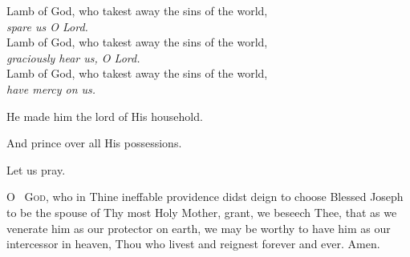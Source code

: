 Lamb of God, who takest away the sins of the world,\\
\qquad	\textit{spare us O Lord.}\\
Lamb of God, who takest away the sins of the world,\\
\qquad	\textit{graciously hear us, O Lord.}\\
Lamb of God, who takest away the sins of the world,\\
\qquad	\textit{have mercy on us.}

\bigskip

\begin{hangparas}{1em}{-1}
\parskip0mm
\Vbar He made him the lord of His household.
 
 \Rbar And prince over all His possessions.
 
 \end{hangparas}

{\centering Let us pray.\par}

\lettrine{O}{~ God,} who in Thine ineffable providence didst deign to choose Blessed Joseph to be the spouse of Thy most Holy Mother,
grant, we beseech Thee, that as we venerate him as our protector on earth, 
we may be worthy to have him as our intercessor in heaven,
Thou who livest and reignest forever and ever. 
\Rbar Amen.




